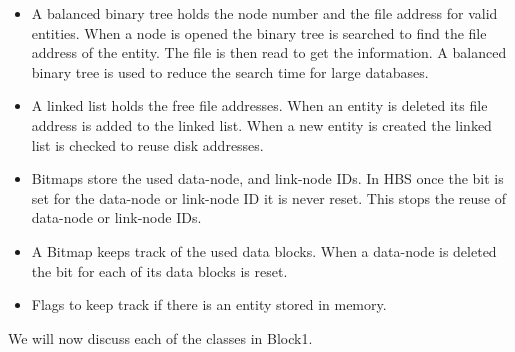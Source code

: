 \begin{itemize}

\item{A balanced binary tree holds the node number and the file address for
  valid entities.  When a node is opened the binary tree is searched to find
  the file address of the entity.  The file is then read to get the
  information.  A balanced binary tree is used to reduce the search time for
  large databases.}

\item{A linked list holds the free file addresses.  When an entity is
  deleted its file address is added to the linked list.  When a new entity
  is created the linked list is checked to reuse disk addresses.}

\item{Bitmaps store the used data-node, and link-node IDs.  In HBS once the
  bit is set for the data-node or link-node ID it is never reset.  This stops
  the reuse of data-node or link-node IDs.}

\item{A Bitmap keeps track of the used data blocks.  When a data-node is
  deleted the bit for each of its data blocks is reset.}

\item{Flags to keep track if there is an entity stored in memory.}

\end{itemize}

We will now discuss each of the classes in Block1.

